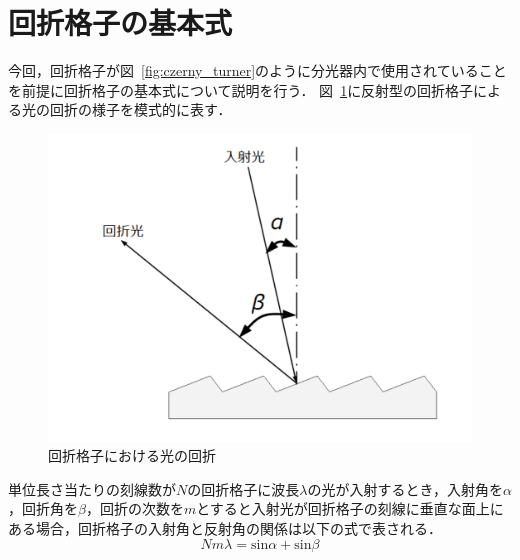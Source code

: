 \section{回折格子の基本式}
今回，回折格子が図\ \ref{fig:czerny_turner}のように分光器内で使用されていることを前提に回折格子の基本式について説明を行う．
図\ \ref{fig:grating_principle}に反射型の回折格子による光の回折の様子を模式的に表す．
\begin{figure}[htbp]
    \centering
    \includegraphics[scale=0.5]{figure/grating_principle.pdf}
    \caption{回折格子における光の回折}
    \label{fig:grating_principle}
\end{figure}
単位長さ当たりの刻線数が$N$の回折格子に波長$\lambda$の光が入射するとき，入射角を$\alpha$，回折角を$\beta$，回折の次数を$m$とすると入射光が回折格子の刻線に垂直な面上にある場合，回折格子の入射角と反射角の関係は以下の式で表される．
\begin{equation}
     Nm\lambda = \mathrm{sin}{\alpha}+\mathrm{sin}{\beta}
\end{equation}
